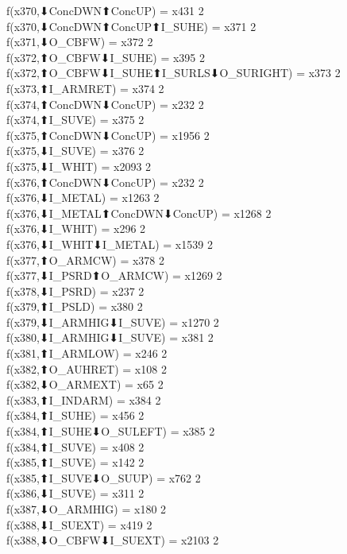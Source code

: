 f(x370,⬇ConcDWN⬆ConcUP) = x431 {2} \\
f(x370,⬇ConcDWN⬆ConcUP⬆I_SUHE) = x371 {2} \\
f(x371,⬇O_CBFW) = x372 {2} \\
f(x372,⬆O_CBFW⬇I_SUHE) = x395 {2} \\
f(x372,⬆O_CBFW⬇I_SUHE⬆I_SURLS⬇O_SURIGHT) = x373 {2} \\
f(x373,⬆I_ARMRET) = x374 {2} \\
f(x374,⬆ConcDWN⬇ConcUP) = x232 {2} \\
f(x374,⬆I_SUVE) = x375 {2} \\
f(x375,⬆ConcDWN⬇ConcUP) = x1956 {2} \\
f(x375,⬇I_SUVE) = x376 {2} \\
f(x375,⬇I_WHIT) = x2093 {2} \\
f(x376,⬆ConcDWN⬇ConcUP) = x232 {2} \\
f(x376,⬇I_METAL) = x1263 {2} \\
f(x376,⬇I_METAL⬆ConcDWN⬇ConcUP) = x1268 {2} \\
f(x376,⬇I_WHIT) = x296 {2} \\
f(x376,⬇I_WHIT⬇I_METAL) = x1539 {2} \\
f(x377,⬆O_ARMCW) = x378 {2} \\
f(x377,⬇I_PSRD⬆O_ARMCW) = x1269 {2} \\
f(x378,⬇I_PSRD) = x237 {2} \\
f(x379,⬆I_PSLD) = x380 {2} \\
f(x379,⬇I_ARMHIG⬇I_SUVE) = x1270 {2} \\
f(x380,⬇I_ARMHIG⬇I_SUVE) = x381 {2} \\
f(x381,⬆I_ARMLOW) = x246 {2} \\
f(x382,⬆O_AUHRET) = x108 {2} \\
f(x382,⬇O_ARMEXT) = x65 {2} \\
f(x383,⬆I_INDARM) = x384 {2} \\
f(x384,⬆I_SUHE) = x456 {2} \\
f(x384,⬆I_SUHE⬇O_SULEFT) = x385 {2} \\
f(x384,⬆I_SUVE) = x408 {2} \\
f(x385,⬆I_SUVE) = x142 {2} \\
f(x385,⬆I_SUVE⬇O_SUUP) = x762 {2} \\
f(x386,⬇I_SUVE) = x311 {2} \\
f(x387,⬇O_ARMHIG) = x180 {2} \\
f(x388,⬇I_SUEXT) = x419 {2} \\
f(x388,⬇O_CBFW⬇I_SUEXT) = x2103 {2} \\

